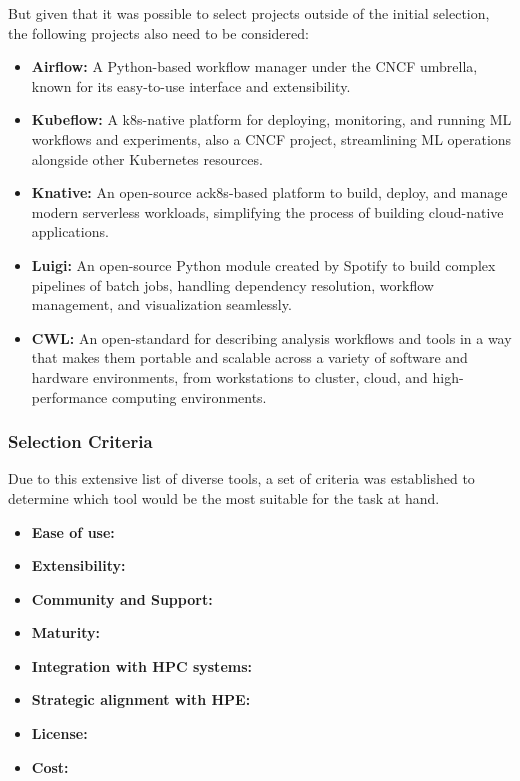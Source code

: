 But given that it was possible to select projects outside of the initial selection, the following projects also need to be considered:


\begin{itemize}
    \item \textbf{Airflow:} A Python-based workflow manager under the \ac{CNCF} umbrella, known for its easy-to-use interface and extensibility.
    \item \textbf{Kubeflow:} A \ac{k8s}-native platform for deploying, monitoring, and running ML workflows and experiments, also a \ac{CNCF} project, streamlining \ac{ML} operations alongside other Kubernetes resources.
    \item \textbf{Knative:} An open-source ac{k8s}-based platform to build, deploy, and manage modern serverless workloads, simplifying the process of building cloud-native applications.
    \item \textbf{Luigi:} An open-source Python module created by Spotify to build complex pipelines of batch jobs, handling dependency resolution, workflow management, and visualization seamlessly.
    \item \textbf{\ac{CWL}:} An open-standard for describing analysis workflows and tools in a way that makes them portable and scalable across a variety of software and hardware environments, from workstations to cluster, cloud, and high-performance computing environments.
\end{itemize}
    

\subsubsection{Selection Criteria}

Due to this extensive list of diverse tools, a set of criteria was established to determine which tool would be the most suitable for the task at hand.

\begin{itemize}
    \item \textbf{Ease of use:} 
    \item \textbf{Extensibility:}
    \item \textbf{Community and Support:}
    \item \textbf{Maturity:}
    \item \textbf{Integration with \ac{HPC} systems:}
    \item \textbf{Strategic alignment with \ac{HPE}:}
    \item \textbf{License:}
    \item \textbf{Cost:}
\end{itemize}

